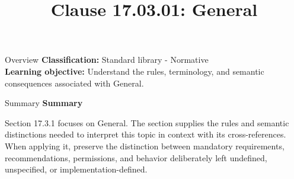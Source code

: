 \documentclass[10pt,letterpaper]{article}
\title{Clause 17.03.01: General}
\author{}
\date{}
\begin{document}
\maketitle
\begin{CornellOverviewBox}{Overview}
\textbf{Classification:} Standard library - Normative\\[2pt]
\textbf{Learning objective:} Understand the rules, terminology, and semantic consequences associated with General.
\end{CornellOverviewBox}\begin{CornellSummaryBox}{Summary}
{\sffamily\bfseries\color{Accent} Summary}\par\vspace{3pt}Section 17.3.1 focuses on General. The section supplies the rules and semantic distinctions needed to interpret this topic in context with its cross-references. When applying it, preserve the distinction between mandatory requirements, recommendations, permissions, and behavior deliberately left undefined, unspecified, or implementation-defined.
\end{CornellSummaryBox}
\end{document}
